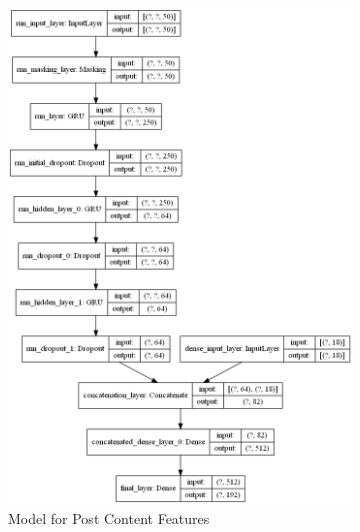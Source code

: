 \documentclass[acmsmall]{acmart}
\begin{document}
\begin{figure}[H]
\centering
\begin{subfigure}{.5\textwidth}
\centering
  \includegraphics[width=.9\linewidth]{assets/AuthorAttributionModel_post_content_features.png}
  \caption{Model for Post Content Features}
  \label{fig:post_content_model}
 \end{subfigure}%
\begin{subfigure}{.5\textwidth}
\centering

\end{subfigure}
\end{figure}
\end{document}
